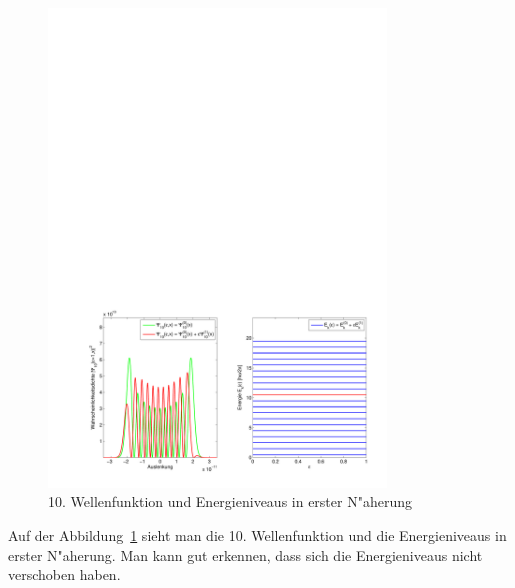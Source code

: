 \begin{refsection}
\begin{figure}[h]	%
\centering
\includegraphics[width=0.8\textwidth]{anharmonisch/images/x3/Stoerung1Wellenfunktion.pdf}
\caption{10. Wellenfunktion und Energieniveaus in erster N"aherung
\label{skript:x3_Stoerung1Wellenfunktion}}
\end{figure}

Auf der Abbildung~\ref{skript:x3_Stoerung1Wellenfunktion} sieht man die 10. Wellenfunktion und die Energieniveaus in erster N"aherung. Man kann gut erkennen, dass sich die Energieniveaus nicht verschoben haben.


\end{refsection}
